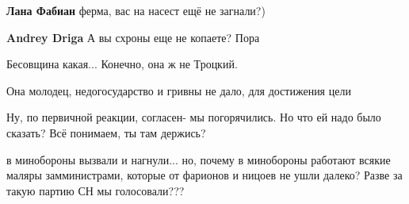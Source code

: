 \begin{itemize}
\begin{itemize}
\textbf{Лана Фабиан} ферма, вас на насест ещё не загнали?)

 
\textbf{Andrey Driga} А вы схроны еще не копаете? Пора
\end{itemize}

 
Бесовщина какая... Конечно, она ж не Троцкий.

 
Она молодец, недогосударство и гривны не дало, для достижения цели

 
Ну, по первичной реакции, согласен- мы погорячились. Но что ей надо было сказать? Всё понимаем, ты там держись?

 

в минобороны вызвали и нагнули... но, почему в минобороны работают всякие маляры
замминистрами, которые от фарионов и ницоев не ушли далеко? Разве за такую
партию СН мы голосовали???

\begin{itemize}
 

\end{itemize}
\end{itemize}
